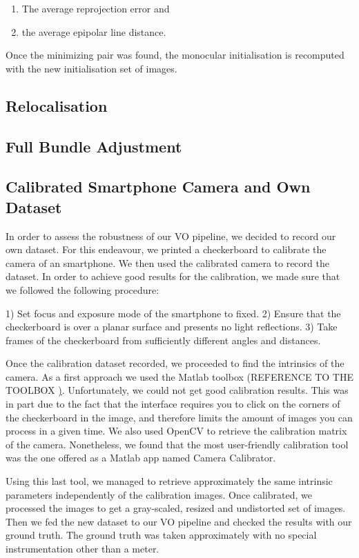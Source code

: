 \begin{enumerate}
\item The average reprojection error and 
\item the average epipolar line distance.
\end{enumerate}

Once the minimizing pair was found, the monocular initialisation is recomputed with the new initialisation set of images.

\subsection{Relocalisation}

\subsection{Full Bundle Adjustment}

\subsection{Calibrated Smartphone Camera and Own Dataset}

In order to assess the robustness of our VO pipeline, we decided to record our own dataset.
For this endeavour, we printed a checkerboard to calibrate the camera of an smartphone.
We then used the calibrated camera to record the dataset.
In order to achieve good results for the calibration, we made sure that we followed the following procedure:

1) Set focus and exposure mode of the smartphone to fixed.
2) Ensure that the checkerboard is over a planar surface and presents no light reflections.
3) Take frames of the checkerboard from sufficiently different angles and distances.

Once the calibration dataset recorded, we proceeded to find the intrinsics of the camera.
As a first approach we used the Matlab toolbox (REFERENCE TO THE TOOLBOX \href{https://www.vision.caltech.edu/bouguetj/calib_doc/}).
Unfortunately, we could not get good calibration results.
This was in part due to the fact that the interface requires you to click on the
corners of the checkerboard in the image, and therefore limits the amount of images you can process in a given time.
We also used OpenCV to retrieve the calibration matrix of the camera. Nonetheless, we found that the most user-friendly
calibration tool was the one offered as a Matlab app named Camera Calibrator.

Using this last tool, we managed to retrieve approximately the same intrinsic parameters independently of the calibration images.
Once calibrated, we processed the images to get a gray-scaled, resized and undistorted set of images. Then we fed the new
dataset to our VO pipeline and checked the results with our ground truth.
The ground truth was taken approximately with no special instrumentation other than a meter.

